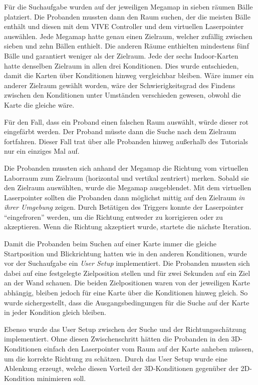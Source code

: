 Für die Suchaufgabe wurden auf der jeweiligen Megamap in sieben räumen Bälle platziert.
Die Probanden mussten dann den Raum suchen, der die meisten Bälle enthält und diesen mit dem VIVE Controller und dem virtuellen Laserpointer auswählen.
Jede Megamap hatte genau einen Zielraum, welcher zufällig zwischen sieben und zehn Bällen enthielt.
Die anderen Räume enthielten mindestens fünf Bälle und garantiert weniger als der Zielraum.
Jede der sechs Indoor-Karten hatte denselben Zielraum in allen drei Konditionen.
Dies wurde entschieden, damit die Karten über Konditionen hinweg vergleichbar bleiben.
Wäre immer ein anderer Zielraum gewählt worden, wäre der Schwierigkeitsgrad des Findens zwischen den Konditionen unter Umständen verschieden gewesen, obwohl die Karte die gleiche wäre.

Für den Fall, dass ein Proband einen falschen Raum auswählt, würde dieser rot eingefärbt werden.
Der Proband müsste dann die Suche nach dem Zielraum fortfahren.
Dieser Fall trat über alle Probanden hinweg außerhalb des Tutorials nur ein einziges Mal auf.

Die Probanden mussten sich anhand der Megamap die Richtung vom virtuellen Laborraum zum Zielraum (horizontal und vertikal zentriert) merken.
Sobald sie den Zielraum auswählten, wurde die Megamap ausgeblendet.
Mit dem virtuellen Laserpointer sollten die Probanden dann möglichst mittig auf den Zielraum \emph{in ihrer Umgebung} zeigen.
Durch Betätigen des Triggers konnte der Laserpointer \enquote{eingefroren} werden, um die Richtung entweder zu korrigieren oder zu akzeptieren.
Wenn die Richtung akzeptiert wurde, startete die nächste Iteration.

Damit die Probanden beim Suchen auf einer Karte immer die gleiche Startposition und Blickrichtung hatten wie in den anderen Konditionen, wurde vor der Suchaufgabe ein \emph{User Setup} implementiert.
Die Probanden mussten sich dabei auf eine festgelegte Zielposition stellen und für zwei Sekunden auf ein Ziel an der Wand schauen.
Die beiden Zielpositionen waren von der jeweiligen Karte abhängig, bleiben jedoch für eine Karte über die Konditionen hinweg gleich.
So wurde sichergestellt, dass die Ausgangsbedingungen für die Suche auf der Karte in jeder Kondition gleich bleiben.

Ebenso wurde das User Setup zwischen der Suche und der Richtungsschätzung implementiert.
Ohne diesen Zwischenschritt hätten die Probanden in den 3D-Konditionen einfach den Laserpointer vom Raum auf der Karte anheben müssen, um die korrekte Richtung zu schätzen.
Durch das User Setup wurde eine Ablenkung erzeugt, welche diesen Vorteil der 3D-Konditionen gegenüber der 2D-Kondition minimieren soll.

